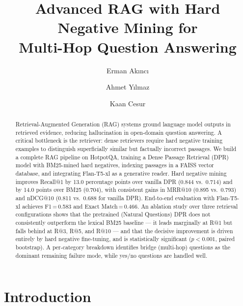 \documentclass{llncs}
\begin{document}
\title{Advanced RAG with Hard Negative Mining for\\Multi-Hop Question Answering}

\author{
    Erman Ak\i nc\i \and
    Ahmet Y\i lmaz \and
    Kaan Cesur
}


\maketitle

\begin{abstract}
Retrieval-Augmented Generation (RAG) systems ground language model outputs
in retrieved evidence, reducing hallucination in open-domain question
answering. A critical bottleneck is the retriever: dense retrievers require
hard negative training examples to distinguish superficially similar but
factually incorrect passages. We build a complete RAG pipeline on HotpotQA,
training a Dense Passage Retrieval (DPR) model with BM25-mined hard
negatives, indexing passages in a FAISS vector database, and integrating
Flan-T5-xl as a generative reader. Hard negative mining improves Recall@1
by 13.0 percentage points over vanilla DPR (0.844 vs.\ 0.714) and by 14.0
points over BM25 (0.704), with consistent gains in MRR@10 (0.895 vs.\ 0.793)
and nDCG@10 (0.811 vs.\ 0.688 for vanilla DPR). End-to-end evaluation with Flan-T5-xl achieves
F1\,=\,0.583 and Exact Match\,=\,0.466. An ablation study over three retrieval
configurations shows that the pretrained (Natural Questions) DPR does not
consistently outperform the lexical BM25 baseline --- it leads marginally
at R@1 but falls behind at R@3, R@5, and R@10 --- and that the decisive
improvement is driven entirely by hard negative fine-tuning, and is
statistically significant ($p < 0.001$, paired bootstrap). A per-category
breakdown identifies bridge (multi-hop) questions as the dominant remaining
failure mode, while yes/no questions are handled well.
\end{abstract}

\section{Introduction}
\end{document}
